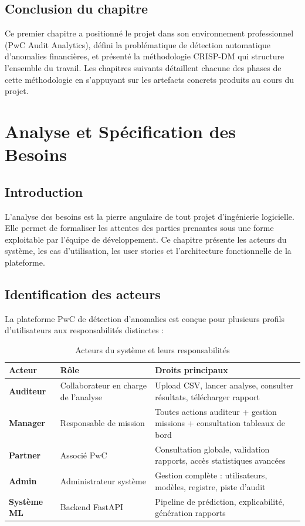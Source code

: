 \documentclass[12pt,a4paper,twoside]{report}
\theoremstyle{definition}
\begin{document}
\section{Conclusion du chapitre}

Ce premier chapitre a positionné le projet dans son environnement professionnel
(PwC Audit Analytics), défini la problématique de détection automatique d'anomalies
financières, et présenté la méthodologie CRISP-DM qui structure l'ensemble du travail.
Les chapitres suivants détaillent chacune des phases de cette méthodologie en
s'appuyant sur les artefacts concrets produits au cours du projet.

\chapter{Analyse et Spécification des Besoins}
\label{chap:besoins}

\section{Introduction}

L'analyse des besoins est la pierre angulaire de tout projet d'ingénierie logicielle.
Elle permet de formaliser les attentes des parties prenantes sous une forme exploitable
par l'équipe de développement. Ce chapitre présente les acteurs du système, les cas
d'utilisation, les user stories et l'architecture fonctionnelle de la plateforme.

\section{Identification des acteurs}

La plateforme PwC de détection d'anomalies est conçue pour plusieurs profils
d'utilisateurs aux responsabilités distinctes :

\begin{table}[H]
\centering
\caption{Acteurs du système et leurs responsabilités}
\label{tab:actors}
\renewcommand{\arraystretch}{1.3}
\begin{tabularx}{\textwidth}{L{2.5cm}L{4cm}L{6cm}}
\toprule
\textbf{Acteur} & \textbf{Rôle} & \textbf{Droits principaux} \\
\midrule
\textbf{Auditeur} & Collaborateur en charge de l'analyse & Upload CSV, lancer analyse, consulter résultats, télécharger rapport \\
\textbf{Manager} & Responsable de mission & Toutes actions auditeur + gestion missions + consultation tableaux de bord \\
\textbf{Partner} & Associé PwC & Consultation globale, validation rapports, accès statistiques avancées \\
\textbf{Admin}   & Administrateur système & Gestion complète : utilisateurs, modèles, registre, piste d'audit \\
\textbf{Système ML} & Backend FastAPI & Pipeline de prédiction, explicabilité, génération rapports \\
\bottomrule
\end{tabularx}
\end{table}
\end{document}
